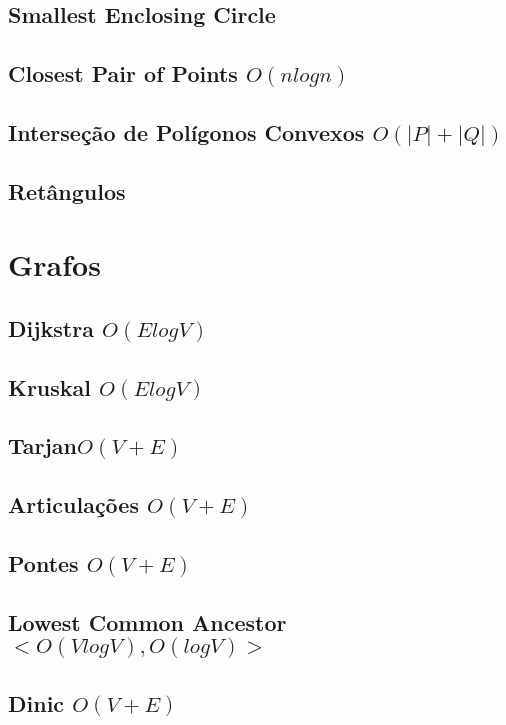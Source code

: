 \documentclass[10pt, letterpaper, twocolumn, twosides]{article}
\begin{document}
\subsection{Smallest Enclosing Circle}

\subsection{Closest Pair of Points ${O(nlogn)}$}

\subsection{Interseção de Polígonos Convexos ${O(|P| + |Q|)}$}

\subsection{Retângulos}


\section{Grafos}
\subsection{Dijkstra ${O(E logV)}$}

\subsection{Kruskal ${O(E logV)}$}

\subsection{Tarjan${O(V+E)}$}

\subsection{Articulações ${O(V+E)}$}

\subsection{Pontes ${O(V+E)}$}

\subsection{Lowest Common Ancestor ${<O(V log V), O(logV)>}$}

\subsection{Dinic ${O(V+E)}$}

\end{document}
